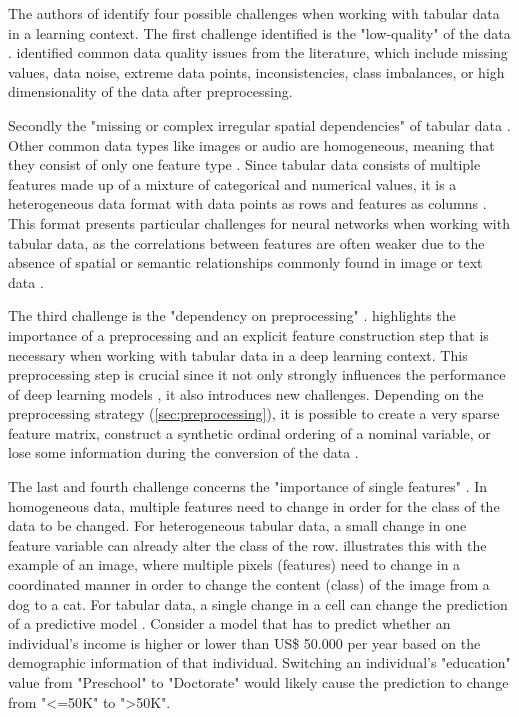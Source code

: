 The authors of \cite{borisov2022DeepNeuralNetworks} identify four possible challenges when working with tabular data in a learning context.
The first challenge identified is the "low-quality" of the data \cite[p. 4]{borisov2022DeepNeuralNetworks}. 
\textcite{borisov2022DeepNeuralNetworks} identified common data quality issues from the literature, which include missing values, data noise, extreme data points, inconsistencies, class imbalances, or high dimensionality of the data after preprocessing.

Secondly the "missing or complex irregular spatial dependencies" of tabular data \cite[p. 4]{borisov2022DeepNeuralNetworks}. 
Other common data types like images or audio are homogeneous, meaning that they consist of only one feature type \cite{borisov2022DeepNeuralNetworks}.
Since tabular data consists of multiple features made up of a mixture of categorical and numerical values, it is a heterogeneous data format with data points as rows and features as columns \cite{borisov2022DeepNeuralNetworks}.
This format presents particular challenges for neural networks when working with tabular data, as the correlations between features are often weaker due to the absence of spatial or semantic relationships commonly found in image or text data \cite{borisov2022DeepNeuralNetworks, yoon2020VIMEExtendingSuccess}.

The third challenge is the "dependency on preprocessing" \cite[p. 4]{borisov2022DeepNeuralNetworks}. 
\cite{borisov2022DeepNeuralNetworks} highlights the importance of a preprocessing and an explicit feature construction step that is necessary when working with tabular data in a deep learning context.
This preprocessing step is crucial since it not only strongly influences the performance of deep learning models \cite{gorishniy2022EmbeddingsNumericalFeatures}, it also introduces new challenges. 
Depending on the preprocessing strategy (\autoref{sec:preprocessing}), it is possible to create a very sparse feature matrix, construct a synthetic ordinal ordering of a nominal variable, or lose some information during the conversion of the data \cite{borisov2022DeepNeuralNetworks}.

The last and fourth challenge concerns the "importance of single features" \cite[p. 4]{borisov2022DeepNeuralNetworks}. 
In homogeneous data, multiple features need to change in order for the class of the data to be changed. 
For heterogeneous tabular data, a small change in one feature variable can already alter the class of the row. 
\cite{borisov2022DeepNeuralNetworks} illustrates this with the example of an image, where multiple pixels (\ie features) need to change in a coordinated manner in order to change the content (\ie class) of the image from a dog to a cat.
For tabular data, a single change in a cell can change the prediction of a predictive model \cite{borisov2022DeepNeuralNetworks}. 
Consider a model that has to predict whether an individual's income is higher or lower than US\$ 50.000 per year \cite{Dua:2019} based on the demographic information of that individual.
Switching an individual's "education" value from "Preschool" to "Doctorate" would likely cause the prediction to change from "<=50K" to ">50K".


